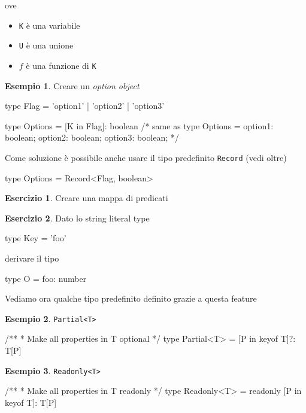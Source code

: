\documentclass[12pt]{article}
\theoremstyle{definition}
\newtheorem{example}{Esempio}[subsection]
\newtheorem{exercise}{Esercizio}[subsection]
\newenvironment{code}
  {\vspace{0.5cm} \VerbatimEnvironment\begin{typescriptcode}}
  {\end{typescriptcode} \vspace{0.2cm}}
\begin{document}
ove

\begin{itemize}
  \item \texttt{K} è una variabile
  \item \texttt{U} è una unione
  \item $f$ è una funzione di \texttt{K}
\end{itemize}

\begin{example}
Creare un \emph{option object}

\begin{code}
type Flag = 'option1' | 'option2' | 'option3'

type Options = { [K in Flag]: boolean }
/* same as
type Options = {
    option1: boolean;
    option2: boolean;
    option3: boolean;
}
*/
\end{code}
\end{example}

Come soluzione è possibile anche usare il tipo predefinito \texttt{Record} (vedi oltre)

\begin{code}
type Options = Record<Flag, boolean>
\end{code}

\begin{exercise}
Creare una mappa di predicati
\end{exercise}

\begin{exercise}
Dato lo string literal type

\begin{code}
type Key = 'foo'
\end{code}

derivare il tipo

\begin{code}
type O = {
  foo: number
}
\end{code}
\end{exercise}

Vediamo ora qualche tipo predefinito definito grazie a questa feature

\begin{example}
\texttt{Partial<T>}

\begin{code}
/**
 * Make all properties in T optional
 */
type Partial<T> = { [P in keyof T]?: T[P] }
\end{code}
\end{example}

\begin{example}
\texttt{Readonly<T>}

\begin{code}
/**
* Make all properties in T readonly
*/
type Readonly<T> = { readonly [P in keyof T]: T[P] }
\end{code}
\end{example}
\end{document}
